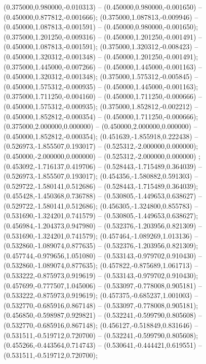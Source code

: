  (0.375000,0.980000,-0.010313) -- (0.450000,0.980000,-0.001650) -- (0.450000,0.877812,-0.001666);
 (0.375000,1.087813,-0.009946) -- (0.450000,1.087813,-0.001591) -- (0.450000,0.980000,-0.001650);
 (0.375000,1.201250,-0.009316) -- (0.450000,1.201250,-0.001491) -- (0.450000,1.087813,-0.001591);
 (0.375000,1.320312,-0.008423) -- (0.450000,1.320312,-0.001348) -- (0.450000,1.201250,-0.001491);
 (0.375000,1.445000,-0.007266) -- (0.450000,1.445000,-0.001163) -- (0.450000,1.320312,-0.001348);
 (0.375000,1.575312,-0.005845) -- (0.450000,1.575312,-0.000935) -- (0.450000,1.445000,-0.001163);
 (0.375000,1.711250,-0.004160) -- (0.450000,1.711250,-0.000666) -- (0.450000,1.575312,-0.000935);
 (0.375000,1.852812,-0.002212) -- (0.450000,1.852812,-0.000354) -- (0.450000,1.711250,-0.000666);
 (0.375000,2.000000,0.000000) -- (0.450000,2.000000,0.000000) -- (0.450000,1.852812,-0.000354);
 (0.451639,-1.855918,0.222438) -- (0.526973,-1.855507,0.193017) -- (0.525312,-2.000000,0.000000);
 (0.450000,-2.000000,0.000000) -- (0.525312,-2.000000,0.000000) ;
 (0.453092,-1.716137,0.419706) -- (0.528443,-1.715489,0.364039) -- (0.526973,-1.855507,0.193017);
 (0.454356,-1.580882,0.591303) -- (0.529722,-1.580141,0.512686) -- (0.528443,-1.715489,0.364039);
 (0.455428,-1.450368,0.736788) -- (0.530805,-1.449653,0.638627) -- (0.529722,-1.580141,0.512686);
 (0.456305,-1.324800,0.855783) -- (0.531690,-1.324201,0.741579) -- (0.530805,-1.449653,0.638627);
 (0.456984,-1.204373,0.947980) -- (0.532376,-1.203956,0.821309) -- (0.531690,-1.324201,0.741579);
 (0.457464,-1.089269,1.013136) -- (0.532860,-1.089074,0.877635) -- (0.532376,-1.203956,0.821309);
 (0.457744,-0.979656,1.051080) -- (0.533143,-0.979702,0.910430) -- (0.532860,-1.089074,0.877635);
 (0.457822,-0.875689,1.061713) -- (0.533222,-0.875973,0.919619) -- (0.533143,-0.979702,0.910430);
 (0.457699,-0.777507,1.045006) -- (0.533097,-0.778008,0.905181) -- (0.533222,-0.875973,0.919619);
 (0.457375,-0.685237,1.001003) -- (0.532770,-0.685916,0.867148) -- (0.533097,-0.778008,0.905181);
 (0.456850,-0.598987,0.929821) -- (0.532241,-0.599790,0.805608) -- (0.532770,-0.685916,0.867148);
 (0.456127,-0.518849,0.831646) -- (0.531511,-0.519712,0.720700) -- (0.532241,-0.599790,0.805608);
 (0.455266,-0.443564,0.714743) -- (0.530641,-0.444421,0.619551) -- (0.531511,-0.519712,0.720700);
